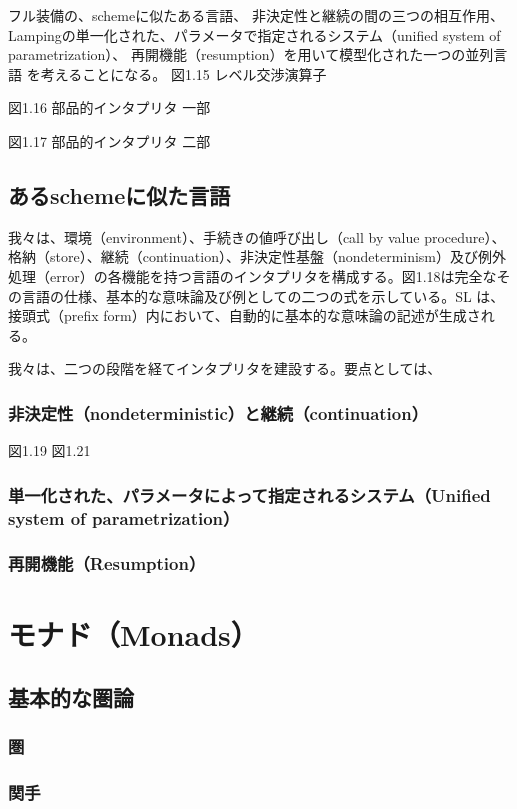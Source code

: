 \documentclass[11pt, oneside]{jsarticle}   	%
\begin{document}
フル装備の、schemeに似たある言語、
非決定性と継続の間の三つの相互作用、
Lampingの単一化された、パラメータで指定されるシステム（unified system of parametrization）、
再開機能（resumption）を用いて模型化された一つの並列言語
を考えることになる。
図1.15 レベル交渉演算子

図1.16 部品的インタプリタ 一部

図1.17 部品的インタプリタ 二部

\subsection{あるschemeに似た言語}
我々は、環境（environment）、手続きの値呼び出し（call by value procedure）、格納（store）、継続（continuation）、非決定性基盤（nondeterminism）及び例外処理（error）の各機能を持つ言語のインタプリタを構成する。図1.18は完全なその言語の仕様、基本的な意味論及び例としての二つの式を示している。SL は、接頭式（prefix form）内において、自動的に基本的な意味論の記述が生成される。

我々は、二つの段階を経てインタプリタを建設する。要点としては、

\subsubsection{非決定性（nondeterministic）と継続（continuation）}
図1.19 %
図1.21 %
\subsubsection{単一化された、パラメータによって指定されるシステム（Unified system of parametrization）}
\subsubsection{再開機能（Resumption）}

\section{ モナド（Monads）}
\subsection{基本的な圏論}
\subsubsection{ 圏 }
\subsubsection{ 関手 }
\end{document}
